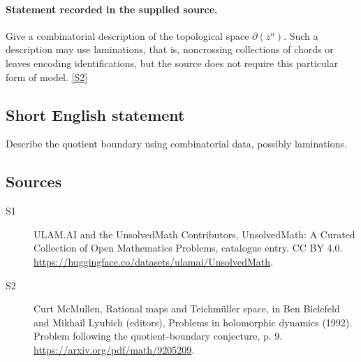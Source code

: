 \documentclass[11pt]{article}
\newcommand{\sref}[2]{\hyperlink{source:#1:#2}{[S#2]}}
\begin{document}
\paragraph{Statement recorded in the supplied source.}
Give a combinatorial description of the topological space $\partial(z^n)$. Such a description may use laminations, that is, noncrossing collections of chords or leaves encoding identifications, but the source does not require this particular form of model. \sref{statement}{2}
\subsection{Short English statement}
Describe the quotient boundary using combinatorial data, possibly laminations.
\subsection{Sources}
\begin{description}
\item[\hypertarget{source:statement:1}{S1}] ULAM.AI and the UnsolvedMath Contributors, UnsolvedMath: A Curated Collection of Open Mathematics Problems, catalogue entry. CC BY 4.0. \url{https://huggingface.co/datasets/ulamai/UnsolvedMath}.
\item[\hypertarget{source:statement:2}{S2}] Curt McMullen, Rational maps and Teichmüller space, in Ben Bielefeld and Mikhail Lyubich (editors), Problems in holomorphic dynamics (1992). Problem following the quotient-boundary conjecture, p. 9. \url{https://arxiv.org/pdf/math/9205209}.
\end{description}
\label{end:statement}
\end{document}
